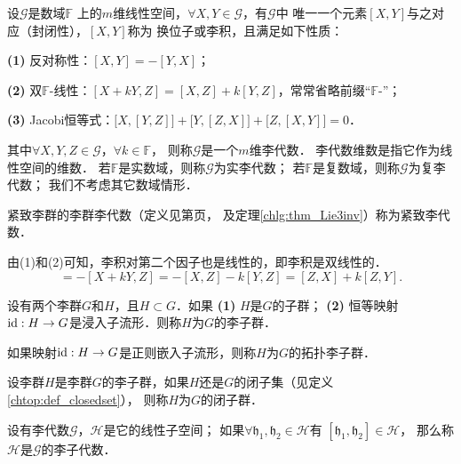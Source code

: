 \begin{definition}\label{chlg:def_la}
    设$\mathscr{G}$是数域$\mathbb{F}$ 
    上的$m$维线性空间，$\forall X,Y \in \mathscr{G}$，有$\mathscr{G}$中
    唯一一个元素$[X,Y]$与之对应（{\heiti 封闭性}），$[X,Y]$称为
    换位子或{\heiti 李积}，且满足如下性质：
    
    {\bfseries (1)} 反对称性：$[X,Y]=-[Y,X]$；
    
    {\bfseries (2)} 双$\mathbb{F}$-线性：$[ X + k Y, Z]= [X, Z]+ k[Y, Z]$，常常省略前缀“$\mathbb{F}$-”；
    
    {\bfseries (3)} Jacobi恒等式：$\bigl[X,[Y,Z]\bigr]+\bigl[Y,[Z,X]\bigr]+\bigl[Z,[X,Y]\bigr]=0$．
    
\noindent    其中$\forall X, Y, Z \in \mathscr{G}$，$\forall k \in \mathbb{F}$，
    则称$\mathscr{G}$是一个$m$维{\heiti 李代数}．
    李代数维数是指它作为线性空间的维数．
    若$\mathbb{F}$是实数域，则称$\mathscr{G}$为{\heiti 实李代数}；
    若$\mathbb{F}$是复数域，则称$\mathscr{G}$为{\heiti 复李代数}；
    我们不考虑其它数域情形．
    
    紧致李群的李群李代数（定义见第\pageref{chlg:eqn_LgXY}页，
    及定理\ref{chlg:thm_Lie3inv}）称为{\heiti 紧致李代数}．
\end{definition}


由(1)和(2)可知，李积对第二个因子也是线性的，即李积是双线性的．
\begin{equation*}
    [Z,  X + k Y]= -[ X + k Y, Z]= -[X, Z]- k[Y, Z] = [Z,X]+ k[Z, Y].
\end{equation*}



\begin{definition}
    设有两个李群$G$和$H$，且$H\subset G$．如果 {\bfseries (1)} $H$是$G$的子群；
    {\bfseries (2)} 恒等映射${\rm id}:H\to G$是浸入子流形．则称$H$为$G$的{\heiti 李子群}．
    
    如果映射${\rm id}:H\to G$是正则嵌入子流形，则称$H$为$G$的{\heiti 拓扑李子群}．
\end{definition}

\begin{definition}
    设李群$H$是李群$G$的李子群，如果$H$还是$G$的闭子集（见定义\ref{chtop:def_closedset}），
    则称$H$为$G$的{\heiti 闭子群}．
\end{definition}

\begin{definition}
    设有李代数$\mathscr{G}$，$\mathscr{H}$是它的线性子空间；
    如果$\forall \mathfrak{h}_1,\mathfrak{h}_2\in \mathscr{H}$有
    $[\mathfrak{h}_1,\mathfrak{h}_2]\in \mathscr{H}$，
    那么称$\mathscr{H}$是$\mathscr{G}$的{\heiti 李子代数}．
\end{definition}

